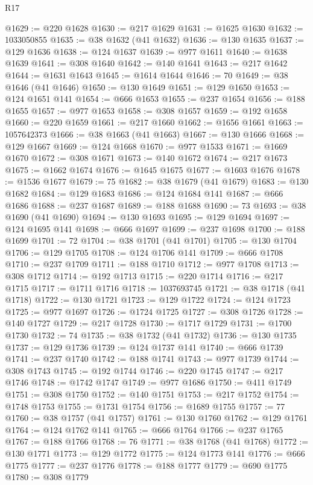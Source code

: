 \begin{lexlean}{R17}
\begin{coremodule}
@1629 := @220 @1628
@1630 := @217 @1629
@1631 := @1625 @1630
@1632 := 1033050855
@1635 := @38 @1632 (@41 @1632)
@1636 := @130 @1635
@1637 := @129 @1636
@1638 := @124 @1637
@1639 := @977 @1611
@1640 := @1638 @1639
@1641 := @308 @1640
@1642 := @140 @1641
@1643 := @217 @1642
@1644 := @1631 @1643
@1645 := @1614 @1644
@1646 := 70
@1649 := @38 @1646 (@41 @1646)
@1650 := @130 @1649
@1651 := @129 @1650
@1653 := @124 @1651 @141
@1654 := @666 @1653
@1655 := @237 @1654
@1656 := @188 @1655
@1657 := @977 @1653
@1658 := @308 @1657
@1659 := @192 @1658
@1660 := @220 @1659
@1661 := @217 @1660
@1662 := @1656 @1661
@1663 := 1057642373
@1666 := @38 @1663 (@41 @1663)
@1667 := @130 @1666
@1668 := @129 @1667
@1669 := @124 @1668
@1670 := @977 @1533
@1671 := @1669 @1670
@1672 := @308 @1671
@1673 := @140 @1672
@1674 := @217 @1673
@1675 := @1662 @1674
@1676 := @1645 @1675
@1677 := @1603 @1676
@1678 := @1536 @1677
@1679 := 75
@1682 := @38 @1679 (@41 @1679)
@1683 := @130 @1682
@1684 := @129 @1683
@1686 := @124 @1684 @141
@1687 := @666 @1686
@1688 := @237 @1687
@1689 := @188 @1688
@1690 := 73
@1693 := @38 @1690 (@41 @1690)
@1694 := @130 @1693
@1695 := @129 @1694
@1697 := @124 @1695 @141
@1698 := @666 @1697
@1699 := @237 @1698
@1700 := @188 @1699
@1701 := 72
@1704 := @38 @1701 (@41 @1701)
@1705 := @130 @1704
@1706 := @129 @1705
@1708 := @124 @1706 @141
@1709 := @666 @1708
@1710 := @237 @1709
@1711 := @188 @1710
@1712 := @977 @1708
@1713 := @308 @1712
@1714 := @192 @1713
@1715 := @220 @1714
@1716 := @217 @1715
@1717 := @1711 @1716
@1718 := 1037693745
@1721 := @38 @1718 (@41 @1718)
@1722 := @130 @1721
@1723 := @129 @1722
@1724 := @124 @1723
@1725 := @977 @1697
@1726 := @1724 @1725
@1727 := @308 @1726
@1728 := @140 @1727
@1729 := @217 @1728
@1730 := @1717 @1729
@1731 := @1700 @1730
@1732 := 74
@1735 := @38 @1732 (@41 @1732)
@1736 := @130 @1735
@1737 := @129 @1736
@1739 := @124 @1737 @141
@1740 := @666 @1739
@1741 := @237 @1740
@1742 := @188 @1741
@1743 := @977 @1739
@1744 := @308 @1743
@1745 := @192 @1744
@1746 := @220 @1745
@1747 := @217 @1746
@1748 := @1742 @1747
@1749 := @977 @1686
@1750 := @411 @1749
@1751 := @308 @1750
@1752 := @140 @1751
@1753 := @217 @1752
@1754 := @1748 @1753
@1755 := @1731 @1754
@1756 := @1689 @1755
@1757 := 77
@1760 := @38 @1757 (@41 @1757)
@1761 := @130 @1760
@1762 := @129 @1761
@1764 := @124 @1762 @141
@1765 := @666 @1764
@1766 := @237 @1765
@1767 := @188 @1766
@1768 := 76
@1771 := @38 @1768 (@41 @1768)
@1772 := @130 @1771
@1773 := @129 @1772
@1775 := @124 @1773 @141
@1776 := @666 @1775
@1777 := @237 @1776
@1778 := @188 @1777
@1779 := @690 @1775
@1780 := @308 @1779

\end{coremodule}
\end{lexlean}
